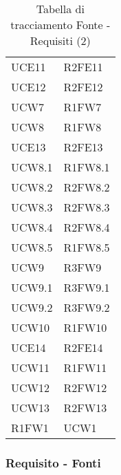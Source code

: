 \begin{table}[!htbp]
\begin{tabular}[t]{ m{}<{\centering}  m{}<{\centering} }
	UCE11 & R2FE11\\
	 
	UCE12 & R2FE12 \\			
	 
	UCW7 & R1FW7 \\	
	 
	UCW8 & R1FW8 \\		
	
	UCE13 & R2FE13  \\	
	 
	UCW8.1 & R1FW8.1 \\	
	 
	UCW8.2 & R2FW8.2 \\	
	 
	UCW8.3 & R2FW8.3\\	
	 
	UCW8.4 & R2FW8.4 \\	 
	 
	UCW8.5 & R1FW8.5 \\	 
	 
	UCW9 & R3FW9 \\	
	 
	UCW9.1 & R3FW9.1\\	 
	 
	UCW9.2 & R3FW9.2\\	  
	 
	UCW10 & R1FW10 \\	 
	 
	UCE14 & R2FE14\\	 
	 	 
	UCW11 & R1FW11\\	 	 	 	

	UCW12 & R2FW12\\

	UCW13 & R2FW13 \\

	R1FW1 & UCW1 \\


\end{tabular}
\caption{Tabella di tracciamento Fonte - Requisiti (2)}
\end{table}

\pagebreak

\subsubsection{Requisito - Fonti}

